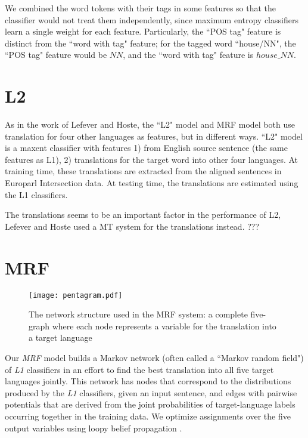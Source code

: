 \documentclass[11pt,letterpaper]{article}
\begin{document}
We combined the word tokens with their tags in some features so that the
classifier would not treat them independently, since maximum entropy
classifiers learn a single weight for each feature.
Particularly, the ``POS tag" feature is distinct from the ``word with tag"
feature; for the tagged word ``house/NN", the ``POS tag" feature would be $NN$, and
the ``word with tag" feature is $house\_NN$. 


\section{L2}
As in the work of Lefever and Hoste, the ``L2" model and MRF model both use
translation for four other languages as features, but in different ways.  ``L2"
model is a maxent classifier with features 1) from English source sentence (the
same features as L1), 2) translations for the target word into other four
languages.  At training time, these translations are extracted from the aligned
sentences in Europarl Intersection data.  At testing time, the translations are
estimated using the L1 classifiers. 

The translations seems to be an important factor in the performance of L2,
Lefever and Hoste used a MT system for the translations instead.
???


\section{MRF}
\begin{figure}
  \begin{center}
  \texttt{[image: pentagram.pdf]}
  \end{center}
  \caption{The network structure used in the MRF system: a complete five-graph
  where each node represents a variable for the translation into a target
language}
  \label{fig:pentagram}
\end{figure}

Our \emph{MRF} model builds a Markov network (often called a ``Markov random
field") of \emph{L1} classifiers in an effort to find the best translation into
all five target languages jointly. This network has nodes that correspond to
the distributions produced by the \emph{L1} classifiers, given an input
sentence, and edges with pairwise potentials that are derived from the joint
probabilities of target-language labels occurring together in the training
data. We optimize assignments over the five output variables using loopy belief
propagation \cite{DBLP:conf/uai/MurphyWJ99}.
\end{document}
